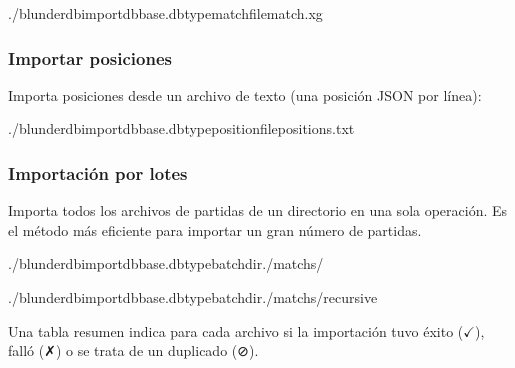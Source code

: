 \documentclass[letterpaper,10pt,spanish]{sphinxmanual}
\begin{document}
\begin{sphinxVerbatim}[commandchars=\\\{\}]
./blunderdbimport\PYGZhy{}\PYGZhy{}dbbase.db\PYGZhy{}\PYGZhy{}typematch\PYGZhy{}\PYGZhy{}filematch.xg
\end{sphinxVerbatim}


\subsubsection{Importar posiciones}
\label{\detokenize{cli:import-de-positions}}
\sphinxAtStartPar
Importa posiciones desde un archivo de texto (una posición JSON por línea):

\begin{sphinxVerbatim}[commandchars=\\\{\}]
./blunderdbimport\PYGZhy{}\PYGZhy{}dbbase.db\PYGZhy{}\PYGZhy{}typeposition\PYGZhy{}\PYGZhy{}filepositions.txt
\end{sphinxVerbatim}


\subsubsection{Importación por lotes}
\label{\detokenize{cli:import-par-lot}}
\sphinxAtStartPar
Importa todos los archivos de partidas de un directorio en una sola operación. Es el método más eficiente para importar un gran número de partidas.

\begin{sphinxVerbatim}[commandchars=\\\{\}]
./blunderdbimport\PYGZhy{}\PYGZhy{}dbbase.db\PYGZhy{}\PYGZhy{}typebatch\PYGZhy{}\PYGZhy{}dir./matchs/

./blunderdbimport\PYGZhy{}\PYGZhy{}dbbase.db\PYGZhy{}\PYGZhy{}typebatch\PYGZhy{}\PYGZhy{}dir./matchs/\PYGZhy{}\PYGZhy{}recursive
\end{sphinxVerbatim}

\sphinxAtStartPar
Una tabla resumen indica para cada archivo si la importación tuvo éxito (\(\checkmark\)), falló (✗) o se trata de un duplicado (⊘).
\end{document}
